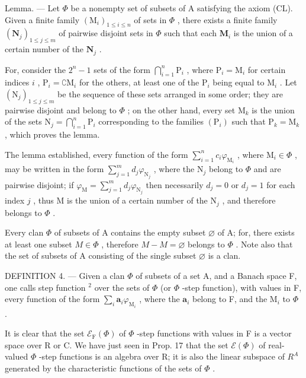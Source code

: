 Lemma. --- Let \(\Phi\) be a nonempty set of subsets of A satisfying the axiom (CL). Given a finite family \((\mathrm{M}_i)_{1 \leqslant i \leqslant n}\) of sets in \(\Phi\) , there exists a finite family \((\mathbf{N}_j)_{1\leqslant j\leqslant m}\) of pairwise disjoint sets in \(\Phi\) such that each \(\mathbf{M}_i\) is the union of a certain number of the \(\mathbf{N}_j\) .

For, consider the \(2^{n} - 1\) sets of the form \(\bigcap_{i=1}^{n} \mathrm{P}_{i}\) , where \(\mathrm{P}_{i} = \mathrm{M}_{i}\) for certain indices \(i\) , \(\mathrm{P}_{i} = \complement \mathrm{M}_{i}\) for the others, at least one of the \(\mathrm{P}_{i}\) being equal to \(\mathrm{M}_{i}\) . Let \((\mathrm{N}_{j})_{1 \leqslant j \leqslant m}\) be the sequence of these sets arranged in some order; they are pairwise disjoint and belong to \(\Phi\) ; on the other hand, every set \(\mathrm{M}_{k}\) is the union of the sets \(\mathrm{N}_{j} = \bigcap_{i=1}^{n} \mathrm{P}_{i}\) corresponding to the families \((\mathrm{P}_{i})\) such that \(\mathrm{P}_{k} = \mathrm{M}_{k}\) , which proves the lemma.

The lemma established, every function of the form \(\sum_{i=1}^{n} c_i \varphi_{\mathrm{M}_i}\) , where \(\mathrm{M}_i \in \Phi\) , may be written in the form \(\sum_{j=1}^{m} d_j \varphi_{\mathrm{N}_j}\) , where the \(\mathrm{N}_j\) belong to \(\Phi\) and are pairwise disjoint; if \(\varphi_{\mathrm{M}} = \sum_{j=1}^{m} d_j \varphi_{\mathrm{N}_j}\) then necessarily \(d_j = 0\) or \(d_j = 1\) for each index \(j\) , thus \(\mathrm{M}\) is the union of a certain number of the \(\mathrm{N}_j\) , and therefore belongs to \(\Phi\) .

Every clan \(\Phi\) of subsets of A contains the empty subset \(\varnothing\) of A; for, there exists at least one subset \(M \in \Phi\) , therefore \(M - M = \varnothing\) belongs to \(\Phi\) . Note also that the set of subsets of A consisting of the single subset \(\varnothing\) is a clan.

DEFINITION 4. --- Given a clan \(\Phi\) of subsets of a set A, and a Banach space F, one calls step function \(^{2}\) over the sets of \(\Phi\) (or \(\Phi\) -step function), with values in F, every function of the form \(\sum_{i} \mathbf{a}_{i} \varphi_{\mathrm{M}_{i}}\) , where the \(\mathbf{a}_{i}\) belong to F, and the \(\mathrm{M}_{i}\) to \(\Phi\) .

It is clear that the set \(\mathcal{E}_{\mathrm{F}}(\Phi)\) of \(\Phi\) -step functions with values in F is a vector space over R or C. We have just seen in Prop. 17 that the set \(\mathcal{E}(\Phi)\) of real-valued \(\Phi\) -step functions is an algebra over R; it is also the linear subspace of \(R^{A}\) generated by the characteristic functions of the sets of \(\Phi\) .

